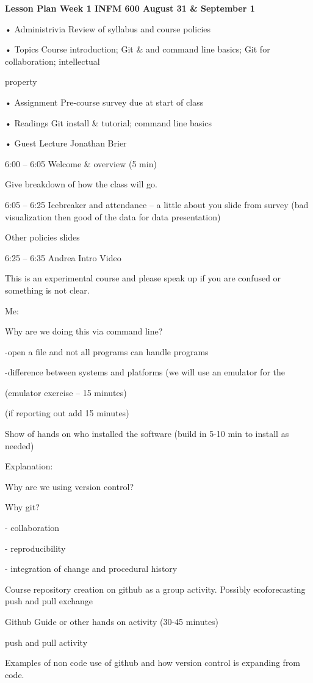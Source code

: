 \documentclass[]{article}
\date{}
\begin{document}
\textbf{Lesson Plan Week 1 INFM 600 August 31 \& September 1}

• Administrivia Review of syllabus and course policies

• Topics Course introduction; Git \& and command line basics; Git for
collaboration; intellectual

property

• Assignment Pre-course survey due at start of class

• Readings Git install \& tutorial; command line basics

• Guest Lecture Jonathan Brier

6:00 -- 6:05 Welcome \& overview (5 min)

Give breakdown of how the class will go.

6:05 -- 6:25 Icebreaker and attendance -- a little about you slide from
survey (bad visualization then good of the data for data presentation)

Other policies slides

6:25 -- 6:35 Andrea Intro Video

This is an experimental course and please speak up if you are confused
or something is not clear.

Me:

Why are we doing this via command line?

-open a file and not all programs can handle programs

-difference between systems and platforms (we will use an emulator for
the

(emulator exercise -- 15 minutes)

(if reporting out add 15 minutes)

Show of hands on who installed the software (build in 5-10 min to
install as needed)

Explanation:

Why are we using version control?

Why git?

- collaboration

- reproducibility

- integration of change and procedural history

Course repository creation on github as a group activity. Possibly
ecoforecasting push and pull exchange

Github Guide or other hands on activity (30-45 minutes)

push and pull activity

Examples of non code use of github and how version control is expanding
from code.
\end{document}
